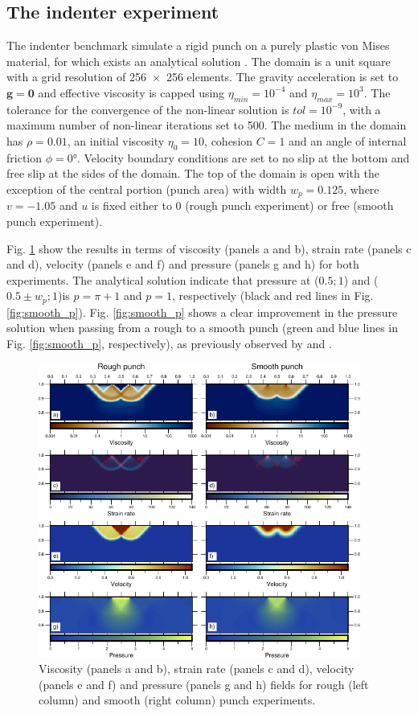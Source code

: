 \documentclass[hidelinks,10pt,a4paper]{article}
\begin{document}
\subsection{The indenter experiment}\label{sec:indenter}
The indenter benchmark simulate a rigid punch on a purely plastic von Mises material, for which exists an analytical solution
\citep{Thieulot2008,Thieulot2014,Glerum2018}. The domain is a unit square with a grid resolution of \num{256x256} elements. The gravity acceleration is set
to $\bm{g}=\bm{0}$ and effective viscosity is capped using $\eta_{min}=10^{-4}$ and $\eta_{max}=10^3$. The tolerance for the convergence of the non-linear
solution is $tol=10^{-9}$, with a maximum number of non-linear iterations set to 500. The medium in the domain has $\rho=0.01$, an initial viscosity
$\eta_0=10$, cohesion $C=1$ and an angle of internal friction $\phi=0$°. Velocity boundary conditions are set to no slip at the bottom and free slip at the
sides of the domain. The top of the domain is open with the exception of the central portion (punch area) with width $w_p=0.125$, where $v=-1.05$ and $u$ is
fixed either to 0 (rough punch experiment) or free (smooth punch experiment).

Fig. \ref{fig:indenter} show the results in terms of viscosity (panels a and b), strain rate (panels c and d), velocity (panels e and f) and pressure
(panels g and h) for both experiments. The analytical solution indicate that pressure at ($0.5;1$) and ($0.5 \pm w_p;1$)is $p=\pi +1$ and $p=1$, respectively
(black and red lines in Fig. \ref{fig:smooth_p}). Fig. \ref{fig:smooth_p} shows a clear improvement in the pressure solution when passing from a rough to a
smooth punch (green and blue lines in Fig. \ref{fig:smooth_p}, respectively), as previously observed by \citet{Thieulot2014} and \citet{Glerum2018}.

\begin{figure}
\centering
\noindent\includegraphics[width=400px]{./Figures/Indenter.pdf}
\caption{Viscosity (panels a and b), strain rate (panels c and d), velocity (panels e and f) and pressure (panels g and h) fields for rough (left column) and
smooth (right column) punch experiments.}
\label{fig:indenter}
\end{figure}
\end{document}
